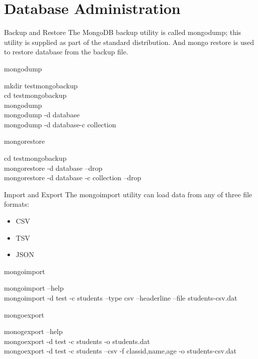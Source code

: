\documentclass{beamer}
\begin{document}
\section{Database Administration}
\begin{frame}{Backup and Restore}
The MongoDB backup utility is called mongodump; this utility is supplied as part of the standard distribution. And mongo restore is used to restore database from the backup file.

\begin{block}{mongodump}
	\scriptsize
	\begin{Alms*}
		mkdir testmongobackup \\
		cd testmongobackup \\
		mongodump \\
		mongodump -d database \\
		mongodump -d database-c collection \\
	\end{Alms*}
\end{block}

\begin{block}{mongorestore}
	\scriptsize
	\begin{Alms*}
		cd testmongobackup \\
		mongorestore -d database --drop \\
		mongorestore -d database -c collection --drop \\
	\end{Alms*}
\end{block}
\end{frame}

\begin{frame}{Import and Export}
	The mongoimport utility can load data from any of three file formats:
	
	\begin{itemize}
		\item CSV
		\item TSV
		\item JSON
	\end{itemize}
	
	\begin{block}{mongoimport}
		\scriptsize
		\begin{Alms*}
			mongoimport --help \\
			mongoimport -d test -c students --type csv \NI --headerline --file students-csv.dat \ND
			
		\end{Alms*}
	\end{block}

	\begin{block}{mongoexport}
		\scriptsize
		\begin{Alms*}
			monogexport --help \\
			mongoexport -d test -c students -o students.dat \\
			
			mongoexport -d test -c students --csv \NI -f classid,name,age -o students-csv.dat \ND	
		\end{Alms*}
	\end{block}

\end{frame}
\end{document}
